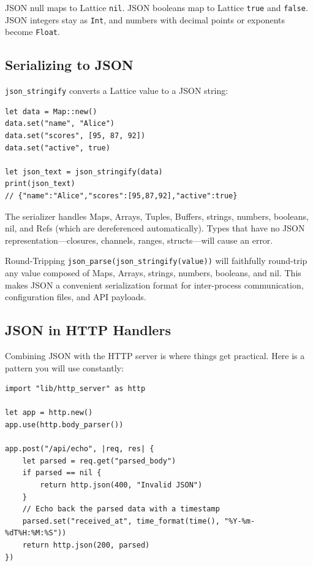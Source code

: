 JSON null maps to Lattice \lstinline|nil|.
JSON booleans map to Lattice \lstinline|true| and \lstinline|false|.
JSON integers stay as \lstinline|Int|, and numbers with decimal points or exponents become \lstinline|Float|.

\subsection{Serializing to JSON}\label{sec:json-stringify}

\lstinline|json_stringify| converts a Lattice value to a JSON string:

\begin{lstlisting}[language=Lattice, caption={Serializing Lattice values to JSON}]
let data = Map::new()
data.set("name", "Alice")
data.set("scores", [95, 87, 92])
data.set("active", true)

let json_text = json_stringify(data)
print(json_text)
// {"name":"Alice","scores":[95,87,92],"active":true}
\end{lstlisting}

The serializer handles Maps, Arrays, Tuples, Buffers, strings, numbers, booleans, nil, and Refs (which are dereferenced automatically).
Types that have no JSON representation---closures, channels, ranges, structs---will cause an error.

\begin{tipbox}{Round-Tripping}
\lstinline|json_parse(json_stringify(value))| will faithfully round-trip any value composed of Maps, Arrays, strings, numbers, booleans, and nil.
This makes JSON a convenient serialization format for inter-process communication, configuration files, and API payloads.
\end{tipbox}

\subsection{JSON in HTTP Handlers}\label{sec:json-http-handlers}

Combining JSON with the HTTP server is where things get practical.
Here is a pattern you will use constantly:

\begin{lstlisting}[language=Lattice, caption={A JSON API endpoint}]
import "lib/http_server" as http

let app = http.new()
app.use(http.body_parser())

app.post("/api/echo", |req, res| {
    let parsed = req.get("parsed_body")
    if parsed == nil {
        return http.json(400, "Invalid JSON")
    }
    // Echo back the parsed data with a timestamp
    parsed.set("received_at", time_format(time(), "%Y-%m-%dT%H:%M:%S"))
    return http.json(200, parsed)
})
\end{lstlisting}

